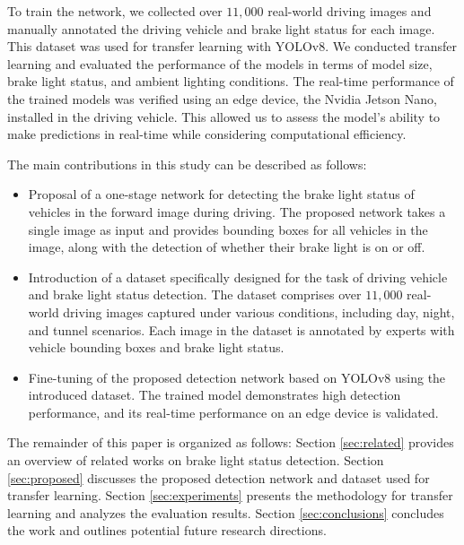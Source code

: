 To train the network, we collected over $11,000$ real-world driving images and manually annotated the driving vehicle and brake light status for each image.
This dataset was used for transfer learning with YOLOv8. 
We conducted transfer learning and evaluated the performance of the models in terms of model size, brake light status, and ambient lighting conditions.
The real-time performance of the trained models was verified using an edge device, the Nvidia Jetson Nano, installed in the driving vehicle.
This allowed us to assess the model's ability to make predictions in real-time while considering computational efficiency.

The main contributions in this study can be described as follows:
\begin{itemize}
    \item Proposal of a one-stage network for detecting the brake light status of vehicles in the forward image during driving. The proposed network takes a single image as input and provides bounding boxes for all vehicles in the image, along with the detection of whether their brake light is on or off. 
    \item Introduction of a dataset specifically designed for the task of driving vehicle and brake light status detection. The dataset comprises over $11,000$ real-world driving images captured under various conditions, including day, night, and tunnel scenarios. Each image in the dataset is annotated by experts with vehicle bounding boxes and brake light status.
    \item Fine-tuning of the proposed detection network based on YOLOv8 using the introduced dataset. The trained model demonstrates high detection performance, and its real-time performance on an edge device is validated.
\end{itemize}

The remainder of this paper is organized as follows:
Section \ref{sec:related} provides an overview of related works on brake light status detection. 
Section \ref{sec:proposed} discusses the proposed detection network and dataset used for transfer learning.
Section \ref{sec:experiments} presents the methodology for transfer learning and analyzes the evaluation results.
Section \ref{sec:conclusions} concludes the work and outlines potential future research directions. 